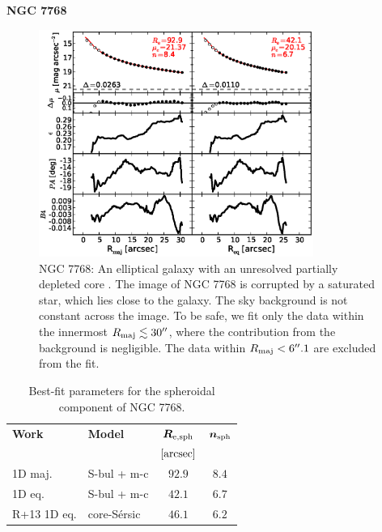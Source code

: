 \documentclass[preprint2]{emulateapj}
\newcommand{\fitfigurewidth}{0.8\textwidth}
\begin{document}
  \clearpage\newpage\noindent
  {\bf NGC 7768 \\}

  \begin{figure}[h]
  \begin{center}
  \includegraphics[width=\fitfigurewidth]{images/n7768_1Dfit.eps}
  \caption{NGC 7768: 
  An elliptical galaxy with an unresolved partially depleted core \citep{rusli2013}. %
  The image of NGC 7768 is corrupted by a saturated star, which lies close to the galaxy.
  The sky background is not constant across the image.
  To be safe, we fit only the data within the innermost $R_{\rm maj} \lesssim 30''$, where the contribution from the background is negligible.
  The data within $R_{\rm maj} < 6''.1$ are excluded from the fit.
  }
  \end{center}
  \end{figure}

  \begin{table}[h]
  \small
  \caption{Best-fit parameters for the spheroidal component of NGC 7768.}
  \begin{center}
  \begin{tabular}{llcc}
  \hline
  {\bf Work} & {\bf Model}   & $\bm R_{\rm e,sph}$    & $\bm n_{\rm sph}$ \\
    &  &  $[\rm arcsec]$ & \\
  \hline
  1D maj. & S-bul + m-c & $92.9$  &  $8.4$ \\
  1D eq.  & S-bul + m-c & $42.1$  &  $6.7$ \\
  \hline
  R+13 1D eq.      & core-S\'ersic & $46.1$  &  $6.2$ \\
  \hline
  \end{tabular}
  \end{center}
  \label{tab:n7768}
  \end{table}
   
\end{document}
